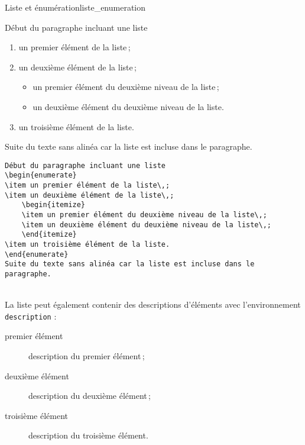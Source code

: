 \documentclass[a4paper, 11pt, twoside, fleqn]{memoir}
\begin{document}
\begin{exemple}{Liste et énumération}{liste_enumeration}
\begin{minipage}[t]{0.4\linewidth}
Début du paragraphe incluant une liste
\begin{enumerate}
\item un premier élément de la liste\,;
\item un deuxième élément de la liste\,;
	\begin{itemize}
	\item un premier élément du deuxième niveau de la liste\,;
	\item un deuxième élément du deuxième niveau de la liste.
	\end{itemize}
\item un troisième élément de la liste.
\end{enumerate}
Suite du texte sans alinéa car la liste est incluse dans le paragraphe.
\end{minipage}
\hfill
\begin{minipage}[t]{0.55\linewidth}
\begin{verbatim}
Début du paragraphe incluant une liste
\begin{enumerate}
\item un premier élément de la liste\,;
\item un deuxième élément de la liste\,;
	\begin{itemize}
	\item un premier élément du deuxième niveau de la liste\,;
	\item un deuxième élément du deuxième niveau de la liste\,;
	\end{itemize}
\item un troisième élément de la liste.
\end{enumerate}
Suite du texte sans alinéa car la liste est incluse dans le paragraphe.
\end{verbatim}
\end{minipage}\\

La liste peut également contenir des descriptions d'éléments avec l'environnement \texttt{description} :\\

\begin{minipage}[t]{0.4\linewidth}
\begin{description}
\item [premier élément] description du premier élément\,;
\item [deuxième élément] description du deuxième élément\,;
\item [troisième élément] description du troisième élément.\\
\end{description}


\end{minipage}
\end{exemple}
\end{document}
